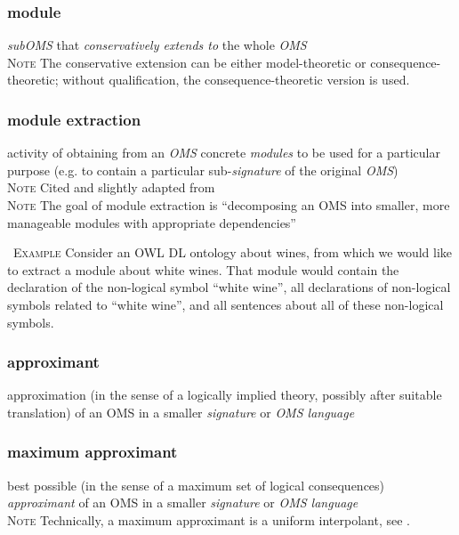 \documentclass[10pt,%
\ifpretendfinal
final%
\else
draft%
\fi,
]{scrreprt}
\makeatletter
\newcommand*{\eg}{e.g.\@\xspace}
\newcommand*\CommentAuthor{}
\renewcommand*\CommentAuthor{#1}}
\newcommand*\CommentDate{}
\renewcommand*\CommentDate{#1}}
\newcommand*\CommentId{}
\renewcommand*\CommentId{#1}}
\newcommand*\CommentType{}
\renewcommand*\CommentType{#1}}
\newcommand*{\SetCommentColorByType}[1]{%
\edef\localType{{#1}}%
\expandafter\ifstrequal\localType{q-aut}{\colorlet{CommentColor}{red}}{%
\expandafter\ifstrequal\localType{q-all}{\colorlet{CommentColor}{orange}}{%
\expandafter\ifstrequal\localType{todo}{\colorlet{CommentColor}{orange}}{%
\expandafter\ifstrequal\localType{fyi}{\colorlet{CommentColor}{lightgray}}{%
\colorlet{CommentColor}{yellow}}}}}}
\newcommand*{\SetCommentPrefixByType}[1]{%
\edef\localType{{#1}}%
\expandafter\@ifmtarg\localType{%
\edef\CommentPrefix{}%
}{%
\caseupper[q]{#1}%
\edef\CommentPrefix{\thestring: }%
}}
\newcommand*{\initComment}[1]{%
\setkeys{Comment}{#1}%
\SetCommentColorByType{\CommentType}%
\relax%
\SetCommentPrefixByType{\CommentType}%
\relax%
}
\newcommand*{\todonote}[2][]{%
\initComment{#1}%
\pdfcomment[author=\CommentAuthor,color=CommentColor,date=\CommentDate,id=\CommentId]{%
\CommentPrefix
#2}}
\newcommand*{\todonoteURL}[1]{#1}
\renewcommand*{\todonote}[2][]{%
\initComment{#1}%
\ednote{\CommentPrefix #2}}
\renewcommand*{\todonoteURL}[1]{\url{#1}}
\newcommand*{\termref}[1]{\textit{#1}}
\newcommand{\termdefinition}[2]{\subsubsection*{\normalsize #1}#2}
\newenvironment{definitions}[0]{\medskip }{}
\newenvironment{note}[0]{\ \\ \textsc{Note} \quad}{}
\newenvironment{example}[0]{\ \newline \textsc{Example}\quad }{}
\makeatother
\begin{document}
\begin{definitions}
  \termdefinition{module}{\termref{subOMS} that \termref{conservatively extends to} the whole \termref{OMS}}
  \begin{note}
    The conservative extension can be either model-theoretic or consequence-theoretic; without qualification, the consequence-theoretic version is used.
  \end{note}

  \termdefinition{module extraction}{activity of obtaining from an \termref{OMS} concrete \termref{modules} to be used for a particular purpose (\eg to contain a particular sub-\termref{signature} of the original \termref{OMS})}
  \begin{note}
    Cited and slightly adapted from \cite{SuarezFigueroaEtAl:OntologyGlossary2008}
  \end{note}
  \begin{note}
    The goal of module extraction is ``decomposing an OMS into smaller, more manageable modules with appropriate dependencies'' \cite{DBLP:series/lncs/5445}
  \end{note}

  \begin{example}
    Consider an OWL DL ontology about wines, from which we would like to extract a module about white wines. That module would contain the declaration of the non-logical symbol ``white wine'', all declarations of non-logical symbols related to ``white wine'', and all sentences about all of these non-logical symbols.
  \end{example}


\termdefinition{approximant}{approximation (in the sense of a logically implied theory, possibly after
suitable translation) 
of an OMS in a smaller \termref{signature} or
\termref{OMS language}}
\termdefinition{maximum approximant}{
best possible (in the sense of a maximum set of logical consequences)
\termref{approximant} of an OMS in a smaller \termref{signature} or \termref{OMS language}}
\begin{note}
 Technically, a maximum approximant is a uniform interpolant, see \cite{DBLP:conf/ijcai/LutzW11}.
\end{note}



\end{definitions}
\end{document}

